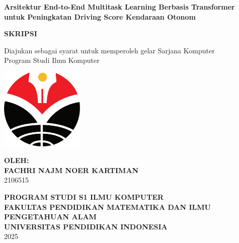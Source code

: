 \begin{titlepage}
    \thispagestyle{empty}
    \begin{center}
        \textbf{\large Arsitektur End-to-End Multitask Learning Berbasis Transformer untuk
        Peningkatan Driving Score Kendaraan Otonom}
    
        \vspace{1.5cm}
    
        \textbf{SKRIPSI}
        \vspace{0.5cm}

        Diajukan sebagai syarat untuk memperoleh gelar Sarjana Komputer \\ Program Studi Ilmu Komputer

        \vspace{2cm}
    
        \includegraphics[width=4cm]{images/image11.png}
    
        \vspace{2cm}
    
        \textbf{OLEH:} \\[0.5cm]
        \textbf{FACHRI NAJM NOER KARTIMAN} \\[0.2cm]
        2106515
    
        \vfill
    
        \textbf{PROGRAM STUDI S1 ILMU KOMPUTER} \\
        \textbf{FAKULTAS PENDIDIKAN MATEMATIKA DAN ILMU PENGETAHUAN ALAM} \\
        \textbf{UNIVERSITAS PENDIDIKAN INDONESIA} \\
        2025
    \end{center}
    \end{titlepage}
    